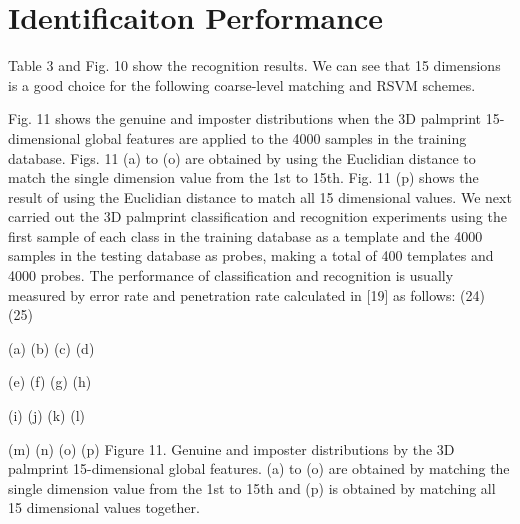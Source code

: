 \section{Identificaiton Performance}
\label{sec:experiment:identificaiton}

Table 3 and Fig. 10 show the recognition results. We can see that 15 dimensions is a good choice for the following coarse-level matching and RSVM schemes.

Fig. 11 shows the genuine and imposter distributions when the 3D palmprint 15-dimensional global features are applied to the 4000 samples in the training database. Figs. 11 (a) to (o) are obtained by using the Euclidian distance to match the single dimension value from the 1st to 15th. Fig. 11 (p) shows the result of using the Euclidian distance to match all 15 dimensional values.
We next carried out the 3D palmprint classification and recognition experiments using the first sample of each class in the training database as a template and the 4000 samples in the testing database as probes, making a total of 400 templates and 4000 probes. The performance of classification and recognition is usually measured by error rate and penetration rate calculated in [19] as follows:
                               (24)
           (25)


         (a)                   (b)                    (c)                   (d)

         (e)                    (f)                   (g)                   (h)

          (i)                   (j)                    (k)                  (l)

          (m)                   (n)                   (o)                   (p)
Figure 11. Genuine and imposter distributions by the 3D palmprint 15-dimensional global features. (a) to (o) are obtained by matching the single dimension value from the 1st to 15th and (p) is obtained by matching all 15 dimensional values together.

